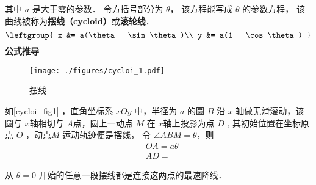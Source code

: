 
\begin{issues}
\issueDraft
\end{issues}

其中 $a$ 是大于零的参数． 令方括号部分为 $\theta$， 该方程能写成 $\theta$ 的参数方程， 该曲线被称为\textbf{摆线（cycloid）}或\textbf{滚轮线}． %
\begin{equation}
\leftgroup{
x &= a(\theta - \sin\theta)\\
y &= a(1 - \cos\theta)
}\end{equation}
\textbf{公式推导}
\begin{figure}[ht]
\centering
\texttt{[image: ./figures/cycloi\_1.pdf]}
\caption{摆线} \label{cycloi_fig1}
\end{figure}
如\autoref{cycloi_fig1} ，直角坐标系 $xOy$ 中，半径为 $a$ 的圆 $B$ 沿 $x$ 轴做无滑滚动，该圆与 $x$轴相切与 $A$点，圆上一动点 $M$ 在 $x$轴上投影为点 $D$ , 其初始位置在坐标原点 $O$ ，动点$M$ 运动轨迹便是摆线， 令 $\angle ABM=\theta$，则
\begin{equation}
\begin{aligned}
&OA=a\theta \\
&AD=
\end{aligned}
\end{equation}



从 $\theta = 0$ 开始的任意一段摆线都是连接这两点的最速降线． 
